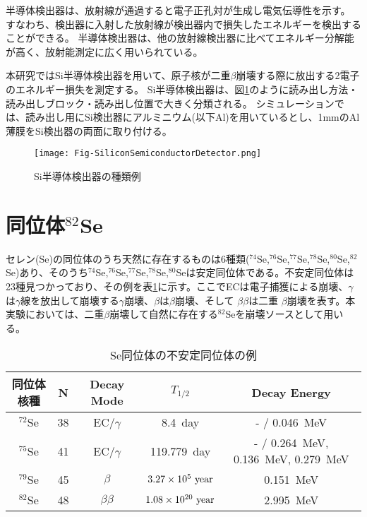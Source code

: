 \documentclass[a4paper,10pt]{jreport}
\begin{document}
半導体検出器は、放射線が通過すると電子正孔対が生成し電気伝導性を示す。
すなわち、検出器に入射した放射線が検出器内で損失したエネルギーを検出することができる。
半導体検出器は、他の放射線検出器に比べてエネルギー分解能が高く、放射能測定に広く用いられている。

本研究ではSi半導体検出器を用いて、原子核が二重$\beta$崩壊する際に放出する2電子のエネルギー損失を測定する。
Si半導体検出器は、図\ref{Fig-SiliconSemiconductorDetector}のように読み出し方法・読み出しブロック・読み出し位置で大きく分類される。
シミュレーションでは、読み出し用にSi検出器にアルミニウム(以下Al)を用いているとし、1mmのAl薄膜をSi検出器の両面に取り付ける。

\begin{figure}[H]
	\center
	\texttt{[image: Fig-SiliconSemiconductorDetector.png]}
	\caption{Si半導体検出器の種類例\cite{hamamatsuHP}} \label{Fig-SiliconSemiconductorDetector}
\end{figure}



\section{同位体$^{82}$Se}

セレン(Se)の同位体のうち天然に存在するものは6種類($^{74}$Se,$^{76}$Se,$^{77}$Se,$^{78}$Se,$^{80}$Se,$^{82}$Se)あり、そのうち$^{74}$Se,$^{76}$Se,$^{77}$Se,$^{78}$Se,$^{80}$Seは安定同位体である。不安定同位体は23種見つかっており、その例を表\ref{Tab-SeIsotope}に示す。ここでECは電子捕獲による崩壊、$\gamma$は$\gamma$線を放出して崩壊する$\gamma$崩壊、$\beta$は$\beta$崩壊、そして $\beta\beta$は二重 $\beta$崩壊を表す。本実験においては、二重$\beta$崩壊して自然に存在する$^{82}$Seを崩壊ソースとして用いる。

\begin{table}[H] 
	\center
	\caption{Se同位体の不安定同位体の例} \label{Tab-SeIsotope}
	\begin{tabular}{ccccc}
		\hline
		同位体核種 & N & Decay Mode & $T_{1/2}$ & Decay Energy \\
		\hline
		$^{72}$Se & 38 & EC/$\gamma$ & \SI{8.4}{day} & - / \SI{0.046}{MeV} \\
		$^{75}$Se & 41 & EC/$\gamma$ & \SI{119.779}{day}  & - / \SI{0.264}{MeV}, \SI{0.136}{MeV}, \SI{0.279}{MeV} \\
		$^{79}$Se & 45 & $\beta$ & $3.27\times10^{5}\ \rm{year}$ & \SI{0.151}{MeV} \\
		$^{82}$Se & 48 & $\beta\beta$ & $1.08\times10^{20}\ \rm{year}$ & \SI{2.995}{MeV} \\
		\hline
	\end{tabular}
\end{table}
\end{document}
